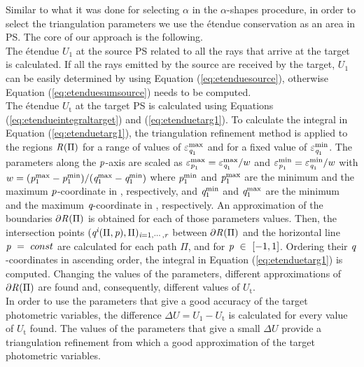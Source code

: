  Similar to what it was done for selecting $\alpha$ in the $\alpha$-shapes procedure, 
in order to select the triangulation parameters we use the \'{e}tendue conservation as an area in PS. The core of our approach is the following.\\
\indent The \'{e}tendue $U_1$ at the source PS  related to all the rays that arrive at the target is calculated. If all the rays emitted by the source are received by the target, $U_1$ can be easily determined by using Equation (\ref{eq:etenduesource}), otherwise Equation (\ref{eq:etenduesumsource}) needs to be computed. 
\\ \indent The \'{e}tendue $U_{\textrm{t}}$ at the target PS  is calculated using Equations (\ref{eq:etendueintegraltarget}) and (\ref{eq:etenduetarg1}).
To calculate the integral in Equation (\ref{eq:etenduetarg1}), the triangulation refinement method is applied to the regions $\mbox{$\emph{R}_{\textit{}}$}(\Pi)$ for a range of values of $\varepsilon_{\textit{q}_1}^{\textrm{max}}$ and for a fixed value of $\varepsilon_{\textit{q}_1}^{\textrm{min}}$. The parameters along the $\textit{p}$-axis are scaled as $\varepsilon_{\textit{p}_1}^{\textrm{max}} = \varepsilon_{\textit{q}_1}^{\textrm{max}}/w$ and 
$\varepsilon_{\textit{p}_1}^{\textrm{min}}  = \varepsilon_{\textit{q}_1}^{\textrm{min}}/w$ with 
$w = (\textit{p}_1^{\textrm{max}}-\textit{p}_1^{\textrm{min}})/(\textit{q}_1^{\textrm{max}}-\textit{q}_1^{\textrm{min}})$ where 
$\textit{p}_1^{\textrm{min}}$ and $\textit{p}_1^{\textrm{max}}$ are the minimum and the maximum $\textit{p}$-coordinate in , respectively, and 
$\textit{q}_1^{\textrm{min}}$ and $\textit{q}_1^{\textrm{max}}$ are the minimum and the maximum $\textit{q}$-coordinate in , respectively.
An approximation of the boundaries $\partial\mbox{$\emph{R}_{\textit{}}$}(\Pi)$ is obtained for each of those parameters values.
Then, the intersection points $(\textit{q}^{\textit{i}}( \Pi, \textit{p}), \Pi)_{\textit{i} = 1, \cdots, \textit{r}}$ between $\partial\mbox{$\emph{R}_{\textit{}}$}(\Pi)$
and the horizontal line $\textit{p}~=~ const$ are calculated for each path $\Pi$, and for $\textit{p}~\in~[-1,1]$. Ordering their $\textit{q}$-coordinates in ascending order, the integral in Equation (\ref{eq:etenduetarg1}) is computed.
Changing the values of the parameters, different approximations of $\partial\mbox{$\emph{R}_{\textit{}}$}(\Pi)$ are found and, consequently, different values of $U_{\textrm{t}}$.
\\ \indent In order to use the parameters that give a good accuracy of the target photometric variables, the difference $\Delta U = U_1-U_{\textrm{t}}$ is calculated for every value of $U_{\textrm{t}}$ found. The values of the parameters that give a small $\Delta U$ provide a triangulation refinement from which a good approximation of the target photometric variables.
